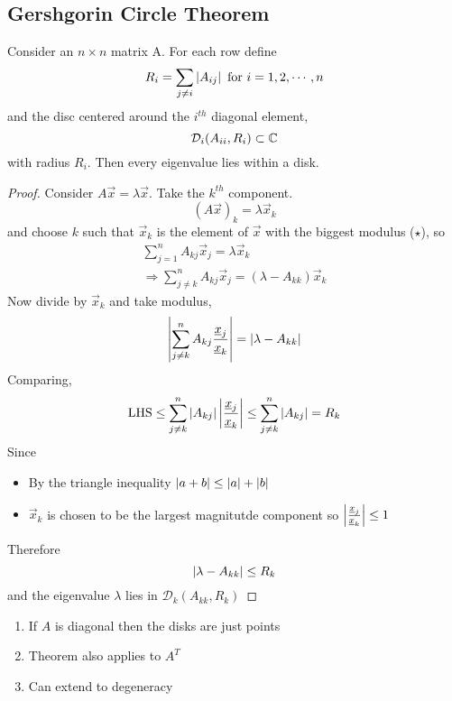 \documentclass{article}
\numberwithin{equation}{section}
\begin{document}
\subsection{Gershgorin Circle Theorem}
\begin{thm}
    Consider an $n \times n$ matrix A. For each row define
    \[
        R_i = \sum_{j \neq i}\left\lvert A_{ij}\right\rvert \text{  for } i = 1, 2, \cdots, n
    \]
    and the disc centered around the $i^{th}$ diagonal element,
    \[
        \mathcal{D}_i(A_{ii}, R_i) \subset \mathbb{C}
    \]
    with radius $R_i$.
    Then every eigenvalue lies within a disk.
\end{thm}
\begin{proof}
    Consider $A \vec x = \lambda \vec x$. Take the $k^{th}$ component.
    \[
        (A \vec x)_k = \lambda \vec x_k \tag{$\star$}
    \]
    and choose $k$ such that $\vec x_k$ is the element of $\vec x$ with the biggest modulus ($\star$), so
    \begin{align*}
        \sum_{j=1}^{n} A_{kj} \vec x_j = \lambda \vec x_k \\
        \Rightarrow \sum_{j\neq k}^{n} A_{kj} \vec x_j = (\lambda - A_{kk}) \vec x_k
    \end{align*}
    Now divide by $\vec x_k$ and take modulus,
    \[
        \left\lvert \sum_{j\neq k}^{n} A_{kj} \frac{\underline{x}_j}{\underline{x}_k}\right\rvert = \left\lvert \lambda - A_{kk}\right\rvert  
    \]
    Comparing,
    \[
        \text{LHS} \leq \sum_{j\neq k}^{n} \left\lvert A_{kj}\right\rvert \left\lvert \frac{\underline{x}_j}{\underline{x}_k}\right\rvert \leq \sum_{j\neq k}^{n} \left\lvert A_{kj}\right\rvert = R_{k}
    \]
    Since 
    \begin{itemize}
        \item By the triangle inequality $\left\lvert a + b\right\rvert \leq \left\lvert a\right\rvert + \left\lvert b\right\rvert$
        \item $\vec x_k$ is chosen to be the largest magnitutde component so $\left\lvert \frac{\underline{x}_j}{\underline{x}_k}\right\rvert \leq 1$
    \end{itemize}
    Therefore
    \[
        \left\lvert \lambda - A_{kk}\right\rvert \leq R_{k}
    \]
    and the eigenvalue $\lambda$ lies in $\mathcal{D}_k(A_{kk}, R_k)$
\end{proof}
\begin{remark}\leavevmode
    \begin{enumerate}
        \item If $A$ is diagonal then the disks are just points
        \item Theorem also applies to $A^T$
        \item Can extend to degeneracy
    \end{enumerate}
\end{remark}
\end{document}
